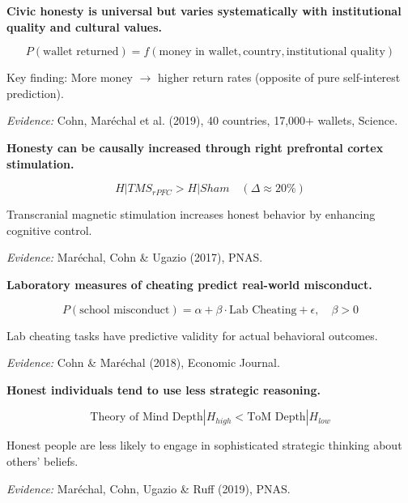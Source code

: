 \begin{tcolorbox}[colback=red!5!white,colframe=red!75!black,title=Axiom UNMAPPED_MM-3: Civic Honesty Universality with Variation]
\textbf{Civic honesty is universal but varies systematically with institutional quality and cultural values.}

\begin{equation}
P(\text{wallet returned}) = f(\text{money in wallet}, \text{country}, \text{institutional quality})
\end{equation}

Key finding: More money $\rightarrow$ higher return rates (opposite of pure self-interest prediction).

\textit{Evidence:} Cohn, Maréchal et al. (2019), 40 countries, 17,000+ wallets, Science.
\end{tcolorbox}

\begin{tcolorbox}[colback=red!5!white,colframe=red!75!black,title=Axiom UNMAPPED_MM-4: Neural Basis of Honesty]
\textbf{Honesty can be causally increased through right prefrontal cortex stimulation.}

\begin{equation}
H | TMS_{rPFC} > H | Sham \quad (\Delta \approx 20\%)
\end{equation}

Transcranial magnetic stimulation increases honest behavior by enhancing cognitive control.

\textit{Evidence:} Maréchal, Cohn \& Ugazio (2017), PNAS.
\end{tcolorbox}

\begin{tcolorbox}[colback=red!5!white,colframe=red!75!black,title=Axiom UNMAPPED_MM-5: Lab-Field Predictive Validity]
\textbf{Laboratory measures of cheating predict real-world misconduct.}

\begin{equation}
P(\text{school misconduct}) = \alpha + \beta \cdot \text{Lab Cheating} + \epsilon, \quad \beta > 0
\end{equation}

Lab cheating tasks have predictive validity for actual behavioral outcomes.

\textit{Evidence:} Cohn \& Maréchal (2018), Economic Journal.
\end{tcolorbox}

\begin{tcolorbox}[colback=red!5!white,colframe=red!75!black,title=Axiom UNMAPPED_MM-6: Honesty-Cognition Link]
\textbf{Honest individuals tend to use less strategic reasoning.}

\begin{equation}
\text{Theory of Mind Depth} | H_{high} < \text{ToM Depth} | H_{low}
\end{equation}

Honest people are less likely to engage in sophisticated strategic thinking about others' beliefs.

\textit{Evidence:} Maréchal, Cohn, Ugazio \& Ruff (2019), PNAS.
\end{tcolorbox}


